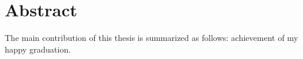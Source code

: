 \chapter*{Abstract}
The main contribution of this thesis is summarized as follows: achievement of my happy graduation.
